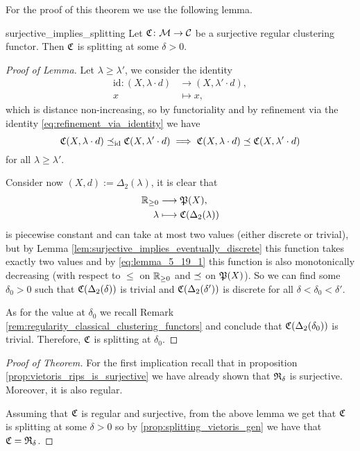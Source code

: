 For the proof of this theorem we use the following lemma.

\begin{lemma}{}{surjective_implies_splitting}
    Let $\Cf\colon \M \to \C$ be a surjective regular clustering functor. Then $\Cf$ is splitting at some $\delta > 0$.
\end{lemma}

\begin{proof}[Proof of Lemma]
    Let $\lambda \ge \lambda'$, we consider the identity
    \begin{align*}
        \mathrm{id}: (X, \lambda \cdot d) &\longrightarrow (X, \lambda' \cdot d),\\
        x &\longmapsto x,
    \end{align*}
    which is distance non-increasing, so by functoriality and by refinement via the identity \eqref{eq:refinement_via_identity} we have
    \begin{equation}
    \label{eq:lemma_5_19_1}
    \Cf(X, \lambda \cdot d) \refines_\mathrm{id} \Cf(X, \lambda' \cdot d) \implies \Cf(X, \lambda \cdot d) \refines \Cf(X, \lambda' \cdot d)
    \end{equation}
    for all $\lambda \ge \lambda'$.

    Consider now $(X,d) := \Delta_2(\lambda)$, it is clear that
    \begin{align*}
        \R_{\geq0} &\longrightarrow \P(X), \\
        \lambda &\longmapsto \Cf(\Delta_2(\lambda))
    \end{align*}
    is piecewise constant and can take at most two values (either discrete or trivial), but by Lemma \ref{lem:surjective_implies_eventually_discrete} this function takes exactly two values and by \eqref{eq:lemma_5_19_1} this function is also monotonically decreasing (with respect to $\le$ on $\R_{\geq0}$ and $\refines$ on $\P(X)$).
    So we can find some $\delta_0 > 0$ such that $\Cf(\Delta_2(\delta))$ is trivial and $\Cf(\Delta_2(\delta'))$ is discrete for all $\delta < \delta_0 < \delta'$.

    As for the value at $\delta_0$ we recall Remark \ref{rem:regularity_classical_clustering_functors} and conclude that $\Cf(\Delta_2(\delta_0))$ is trivial. Therefore, $\Cf$ is splitting at $\delta_0$.
\end{proof}

\begin{proof}[Proof of Theorem]
    For the first implication recall that in proposition \ref{prop:vietoris_rips_is_surjective} we have already shown that $\Rf_\delta$ is surjective. Moreover, it is also regular.

    Assuming that $\Cf$ is regular and surjective, from the above lemma we get that $\Cf$ is splitting at some $\delta > 0$ so by \ref{prop:splitting_vietoris_gen} we have that $\Cf = \Rf_{\delta}$.
\end{proof}

